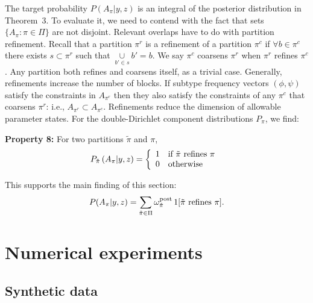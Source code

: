 \documentclass[aoas,preprint]{imsart}
\begin{document}
The target probability $P(A_\pi|y,z)$ is an integral of the posterior distribution in Theorem~3.
To evaluate it, we need to contend with the fact that sets $\{ A_\pi: \pi \in \Pi \}$ are not disjoint.
Relevant overlaps have to do with partition refinement.  Recall 
that a  partition $\pi^r$ is a refinement of a partition $\pi^c$ if $\forall b \in \pi^c$ there 
exists $s \subset \pi^r$  such that $\underset{b'\in s}\cup b' = b$. 
We say $\pi^c$  coarsens $\pi^r$ when $\pi^r$ refines $\pi^c$. Any partition both
refines and coarsens itself, as a trivial case. 
Generally, refinements increase the number of blocks.
 If subtype frequency vectors $(\phi,\psi)$
satisfy the constraints in $A_{\pi^r}$ then they also satisfy the constraints of any $\pi^c$
that coarsens $\pi^r$: i.e., $A_{\pi^r} \subset A_{\pi^c}$.  
Refinements reduce the dimension of allowable parameter states. 
 For the double-Dirichlet
component distributions $P_\pi$, we find:

\noindent
{\bf Property 8:} For two partitions $\tilde \pi$ and $\pi$,  
\begin{eqnarray*}
P_{\tilde \pi}\left( A_{\pi} | y,z \right) = \left\{  \begin{array}{ll}
     1  & {\mbox {\rm if $\tilde \pi$ refines $\pi$ }} \\ 
     0  & {\mbox {\rm otherwise }} \\ 
                                                   \end{array}
   \right.
\end{eqnarray*}


This supports the main finding of this section:
\begin{eqnarray}
P(A_\pi|y,z) = 
\sum_{\tilde \pi \in \Pi} \omega^{\rm post}_{\tilde \pi} \,  1[ {\mbox {\rm $\tilde \pi$ refines $\pi$}} ].
\end{eqnarray}



 
\section{Numerical experiments}

\subsection{Synthetic data} 
\end{document}
